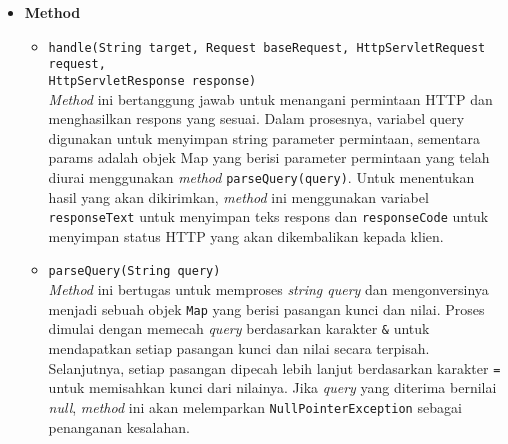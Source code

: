\begin{itemize}
    \item \textbf{Method}
    \begin{itemize}
        \item \texttt{handle(String target, Request baseRequest, HttpServletRequest request,\\ HttpServletResponse response)}
        \\ \textit{Method} ini bertanggung jawab untuk menangani permintaan HTTP dan menghasilkan respons yang sesuai. Dalam prosesnya, variabel query digunakan untuk menyimpan string parameter permintaan, sementara params adalah objek Map yang berisi parameter permintaan yang telah diurai menggunakan \textit{method} \texttt{parseQuery(query)}. Untuk menentukan hasil yang akan dikirimkan, \textit{method} ini menggunakan variabel \texttt{responseText} untuk menyimpan teks respons dan \texttt{responseCode} untuk menyimpan status HTTP yang akan dikembalikan kepada klien.
        \item \texttt{parseQuery(String query)}
        \\ \textit{Method} ini bertugas untuk memproses \textit{string query} dan mengonversinya menjadi sebuah objek \texttt{Map} yang berisi pasangan kunci dan nilai. Proses dimulai dengan memecah \textit{query} berdasarkan karakter \texttt{\&} untuk mendapatkan setiap pasangan kunci dan nilai secara terpisah. Selanjutnya, setiap pasangan dipecah lebih lanjut berdasarkan karakter \texttt{=} untuk memisahkan kunci dari nilainya. Jika \textit{query} yang diterima bernilai \textit{null}, \textit{method} ini akan melemparkan \texttt{NullPointerException} sebagai penanganan kesalahan. 
    \end{itemize}
\end{itemize}

